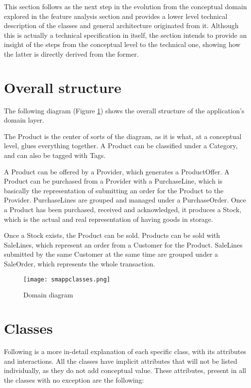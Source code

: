 This section follows as the next step in the evolution from the conceptual domain explored in the feature analysis section and provides a lower level technical description of the classes and general architecture originated from it. Although this is actually a technical specification in itself, the section intends to provide an insight of the steps from the conceptual level to the technical one, showing how the latter is directly derived from the former.

\section{Overall structure}
The following diagram (Figure \ref{fig:smappclasses}) shows the overall structure of the application’s domain layer.

The Product is the center of sorts of the diagram, as it is what, at a conceptual level, glues everything together. A Product can be classified under a Category, and can also be tagged with Tags.

A Product can be offered by a Provider, which generates a ProductOffer. A Product can be purchased from a Provider with a PurchaseLine, which is basically the representation of submitting an order for the Product to the Provider. PurchaseLines are grouped and managed under a PurchaseOrder. Once a Product has been purchased, received and acknowledged, it produces a Stock, which is the actual and real representation of having goods in storage.

Once a Stock exists, the Product can be sold. Products can be sold with SaleLines, which represent an order from a Customer for the Product. SaleLines submitted by the same Customer at the same time are grouped under a SaleOrder, which represents the whole transaction.

\begin{figure}
	\centering
		\texttt{[image: smappclasses.png]}
	\caption{Domain diagram}
	\label{fig:smappclasses}
\end{figure}

\section{Classes}
Following is a more in-detail explanation of each specific class, with its attributes and interactions. All the classes have implicit attributes that will not be listed individually, as they do not add conceptual value. These attributes, present in all the classes with no exception are the following:

